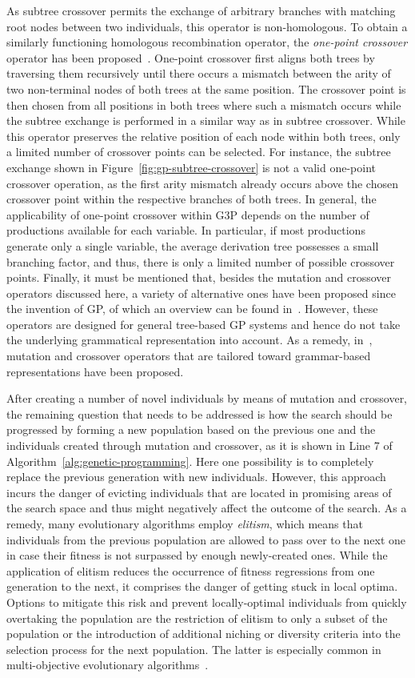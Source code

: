 As subtree crossover permits the exchange of arbitrary branches with matching root nodes between two individuals, this operator is non-homologous.
To obtain a similarly functioning homologous recombination operator, the \emph{one-point crossover} operator has been proposed~\cite{poli1998schema}.
One-point crossover first aligns both trees by traversing them recursively until there occurs a mismatch between the arity of two non-terminal nodes of both trees at the same position.
The crossover point is then chosen from all positions in both trees where such a mismatch occurs while the subtree exchange is performed in a similar way as in subtree crossover.
While this operator preserves the relative position of each node within both trees, only a limited number of crossover points can be selected.
For instance, the subtree exchange shown in Figure~\ref{fig:gp-subtree-crossover} is not a valid one-point crossover operation, as the first arity mismatch already occurs above the chosen crossover point within the respective branches of both trees.
In general, the applicability of one-point crossover within G3P depends on the number of productions available for each variable.
In particular, if most productions generate only a single variable, the average derivation tree possesses a small branching factor, and thus, there is only a limited number of possible crossover points.
Finally, it must be mentioned that, besides the mutation and crossover operators discussed here, a variety of alternative ones have been proposed since the invention of GP, of which an overview can be found in~\cite{poli2008field}.
However, these operators are designed for general tree-based GP systems and hence do not take the underlying grammatical representation into account. 
As a remedy, in~\cite{couchet2007crossover}, mutation and crossover operators that are tailored toward grammar-based representations have been proposed.

After creating a number of novel individuals by means of mutation and crossover, the remaining question that needs to be addressed is how the search should be progressed by forming a new population based on the previous one and the individuals created through mutation and crossover, as it is shown in Line 7 of Algorithm~\ref{alg:genetic-programming}.
Here one possibility is to completely replace the previous generation with new individuals.
However, this approach incurs the danger of evicting individuals that are located in promising areas of the search space and thus might negatively affect the outcome of the search.
As a remedy, many evolutionary algorithms employ \emph{elitism}, which means that individuals from the previous population are allowed to pass over to the next one in case their fitness is not surpassed by enough newly-created ones.
While the application of elitism reduces the occurrence of fitness regressions from one generation to the next, it comprises the danger of getting stuck in local optima.
Options to mitigate this risk and prevent locally-optimal individuals from quickly overtaking the population are the restriction of elitism to only a subset of the population or the introduction of additional niching or diversity criteria into the selection process for the next population. 
The latter is especially common in multi-objective evolutionary algorithms~\cite{coello2007evolutionary}.